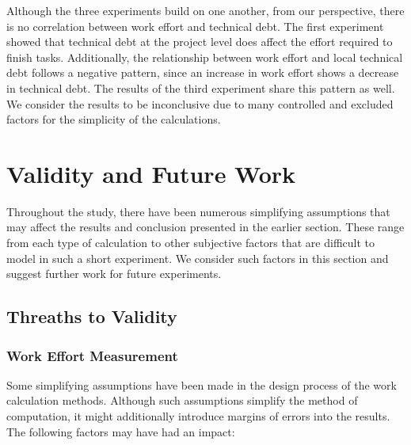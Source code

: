 \documentclass{mpaper}
\begin{document}
Although the three experiments build on one another, from our perspective, there
is no correlation between work effort and technical debt. The first experiment
showed that technical debt at the project level does affect the effort required
to finish tasks. Additionally, the relationship between work effort and local
technical debt follows a negative pattern, since an increase in work effort
shows a decrease in technical debt. The results of the third experiment share
this pattern as well. We consider the results to be inconclusive due to many
controlled and excluded factors for the simplicity of the calculations.

\section{Validity and Future Work}
\label{validity-future-work}

Throughout the study, there have been numerous simplifying assumptions that may
affect the results and conclusion presented in the earlier section. These range
from each type of calculation to other subjective factors that are difficult to
model in such a short experiment. We consider such factors in this section and
suggest further work for future experiments.

\subsection{Threaths to Validity}
\label{validity}

\subsubsection*{Work Effort Measurement}
\label{validity-work}

Some simplifying assumptions have been made in the design process of the work
calculation methods. Although such assumptions simplify the method of
computation, it might additionally introduce margins of errors into the results.
The following factors may have had an impact:
\end{document}
